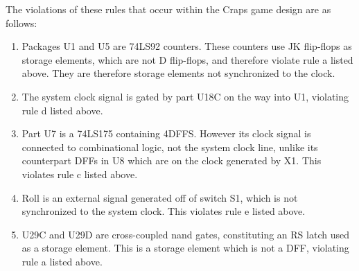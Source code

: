 \documentclass{article}
\begin{document}
\begin{enumerate}
    The violations of these rules that occur within the Craps game design are as 
    follows: 

    \begin{enumerate}
        \item Packages U1 and U5 are 74LS92 counters. These counters use 
              JK flip-flops as storage elements, which are not D flip-flops, and
              therefore violate rule a listed above. They are therefore storage
              elements not synchronized to the clock.
        \item The system clock signal is gated by part U18C on the way into U1,
              violating rule d listed above.
        \item Part U7 is a 74LS175 containing 4DFFS. However its clock signal 
              is connected to combinational logic, not the system clock line,
              unlike its counterpart DFFs in U8 which are on the clock generated
              by X1. This violates rule c listed above.
        \item Roll is an external signal generated off of switch S1, which is 
              not synchronized to the system clock. This violates rule e listed 
              above.
        \item U29C and U29D are cross-coupled nand gates, constituting an RS
              latch used as a storage element. This is a storage element which
              is not a DFF, violating rule a listed above.
    \end{enumerate}


    \end{enumerate}

    \pagebreak
    \begin{scriptsize}
    
    \pagebreak
    
    \end{scriptsize}
\end{document}
